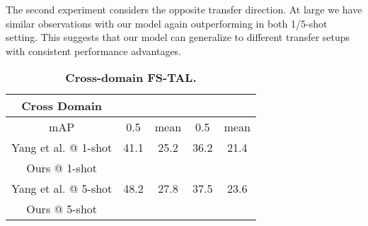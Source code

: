 \documentclass{bmvc2k}
\begin{document}
\noindent{\bf  } 
The second experiment considers the opposite transfer direction. At large we have similar observations with
our model again outperforming \cite{yang2020localizing} in both 1/5-shot setting.
This suggests that our model can generalize to different transfer setups with consistent performance advantages.









\begin{table}[]
\centering
\resizebox{0.7\columnwidth}{!}
{
\begin{tabular}{@{}c|cc|cc@{}}
\toprule
Cross Domain & \multicolumn{2}{c|}{} & \multicolumn{2}{c}{} \\ \midrule
mAP          & 0.5                      & mean                     & 0.5                      & mean                     \\ \midrule
Yang et al. \cite{yang2020localizing} @ 1-shot & 41.1                      & 25.2                      & 36.2                      & 21.4                      \\
Ours @ 1-shot     &                       &                       &                       &                       \\ \midrule \midrule
Yang et al. \cite{yang2020localizing} @ 5-shot & 48.2                      & 27.8                      & 37.5                      & 23.6                      \\
Ours @ 5-shot     &                       &                      &                       &                       \\ \bottomrule
\end{tabular}
}
\vspace{0.15in}
\caption{\textbf{Cross-domain FS-TAL.}
}
\label{tab:cross_domain}
\vspace{-0.5cm}
\end{table}
\end{document}

